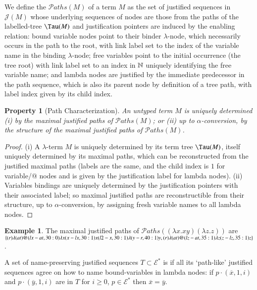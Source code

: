 \documentclass{elsarticle}
\theoremstyle{plain}
\newtheorem{property}[theorem]{Property}
\theoremstyle{definition}
\newtheorem{example}{Example}[section]
\def\nameencoding{\mathcal{E}} %
\newcommand{\ctree}{\Tau} %
\newcommand\pathset{{\mathcal{P}aths}} %
\def\justseqset{\mathcal{J}}
\begin{document}
We define the  $\pathset(M)$ of a term $M$ as the set of justified sequences in $\justseqset(M)$
whose underlying sequences of nodes are those from the paths of the labelled-tree $\ctree(M)$ and justification pointers are induced by the enabling relation:
 bound variable nodes point to their binder $\lambda$-node, which necessarily occurs in the path to the root, with link label set to the index of the variable name in the binding $\lambda$-node;
 free variables point to the initial occurrence (the tree root) with link label  set to an index in $\mathbb{N}$ uniquely identifying the
 free variable name;
 and lambda nodes are justified by the immediate predecessor in the path sequence, which is also its parent node by definition of a tree path, with label index given by its child index.
\begin{property}[Path Characterization]
\label{prop:tree_path_charact}
 An untyped term $M$ is uniquely determined
(i) by the maximal justified paths of $\pathset(M)$;
or (ii) up to $\alpha$-conversion, by the \emph{structure} of the maximal justified paths of $\pathset(M)$.
\end{property}
\begin{proof}
(i) A $\lambda$-term $M$ is uniquely determined by its term tree $\ctree(M)$, itself uniquely determined by its maximal paths, which can be reconstructed from the justified maximal paths (labels are the same, and the child index is $1$ for variable/@ nodes and is given by the justification label for lambda nodes).
%
(ii) Variables bindings are uniquely determined by the justification pointers with their associated label; so maximal justified paths are  reconstructible from their structure, up to $\alpha$-conversion, by assigning fresh variable names to all lambda nodes.
\end{proof}

\begin{example}
    The maximal justified paths of
  $\pathset((\lambda x.x y) (\lambda z.z))$
  are
  $\{
  \Pstr{ (r){\lambda} (at){@} (lx-at,30:0){\lambda x} (x-lx,30:1){x} (l2-x,30:1){\lambda} (y-r,40:1){y} },
  \Pstr{ (r){\lambda} (at){@} (lz-at,35:1){\lambda z} (z-lz,35:1){z}}
  \}$.
\end{example}

A set of name-preserving justified sequences $T\subset \nameencoding^*$ is  if all its `path-like' justified sequences agree on how to name bound-variables in lambda nodes: if $p \cdot (\overline{x}, 1, i)$ and $p \cdot (\overline{y}, 1, i)$ are in $T$ for $i\geq 0$, $p\in \nameencoding^*$ then $\overline{x} = \overline{y}$.
\end{document}
